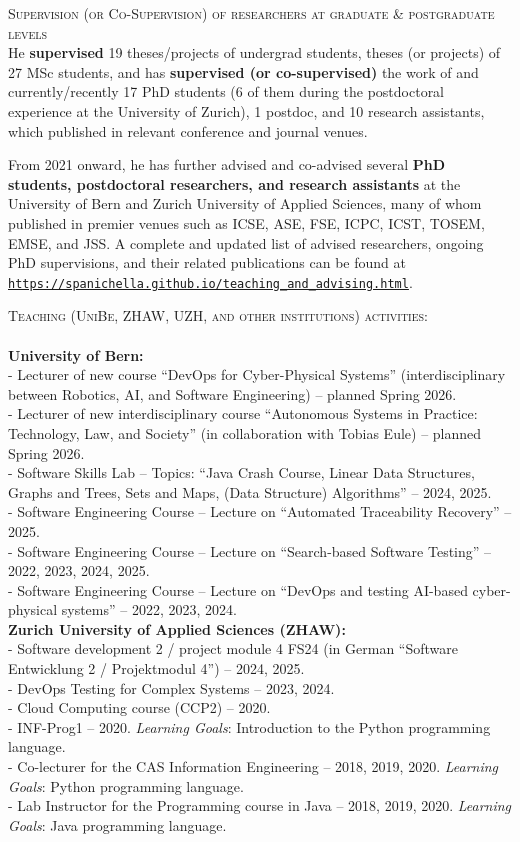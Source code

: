 \documentclass[11pt]{article}
\providecommand*\url[1]{\href{#1}{#1}}
\renewcommand*\url[1]{\href{#1}{\texttt{#1}}}
\begin{document}
 
\medskip \medskip
\textsc{Supervision (or Co-Supervision) of researchers at graduate \& postgraduate levels}
\medskip \\
He \textbf{supervised} 19 theses/projects of undergrad students, theses (or projects) of 27 MSc students, and has \textbf{supervised (or co-supervised)} the work of and currently/recently 17 PhD students (6 of them during the postdoctoral experience at the University of Zurich), 1 postdoc, and 10 research assistants, which published in relevant conference and journal venues. 

From 2021 onward, he has further advised and co-advised several \textbf{PhD students, postdoctoral researchers, and research assistants} at the University of Bern and Zurich University of Applied Sciences, many of whom published in premier venues such as ICSE, ASE, FSE, ICPC, ICST, TOSEM, EMSE, and JSS. A complete and updated list of advised researchers, ongoing PhD supervisions, and their related publications can be found at
\url{https://spanichella.github.io/teaching\_and\_advising.html}.

\textsc{Teaching (UniBe, ZHAW, UZH, and other institutions) activities:}
 \\
\\
\textbf{University of Bern:}
\medskip \\
- Lecturer of new course ``DevOps for Cyber-Physical Systems'' (interdisciplinary between Robotics, AI, and Software Engineering) – planned Spring 2026.\\
- Lecturer of new interdisciplinary course ``Autonomous Systems in Practice: Technology, Law, and Society'' (in collaboration with Tobias Eule) – planned Spring 2026.\\
- Software Skills Lab – Topics: ``Java Crash Course, Linear Data Structures, Graphs and Trees, Sets and Maps, (Data Structure) Algorithms'' – 2024, 2025.\\
- Software Engineering Course – Lecture on ``Automated Traceability Recovery'' – 2025.\\
- Software Engineering Course – Lecture on ``Search-based Software Testing'' – 2022, 2023, 2024, 2025.\\
- Software Engineering Course – Lecture on ``DevOps and testing AI-based cyber-physical systems'' – 2022, 2023, 2024.\\
 

\textbf{Zurich University of Applied Sciences (ZHAW):}
\medskip \\
- Software development 2 / project module 4 FS24 (in German ``Software Entwicklung 2 / Projektmodul 4'') – 2024, 2025.\\
- DevOps Testing for Complex Systems – 2023, 2024.\\
- Cloud Computing course (CCP2) – 2020.\\
- INF-Prog1 – 2020. \textit{Learning Goals}: Introduction to the Python programming language.\\
- Co-lecturer for the CAS Information Engineering – 2018, 2019, 2020. \textit{Learning Goals}: Python programming language.\\
- Lab Instructor for the Programming course in Java – 2018, 2019, 2020. \textit{Learning Goals}: Java programming language.\\
\end{document}

